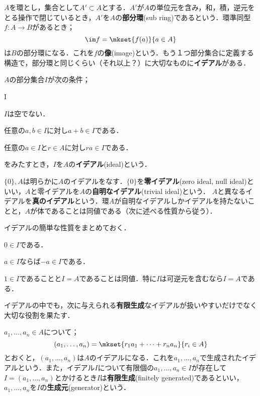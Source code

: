 $A$を環とし，集合として$A'\subset A$とする．$A'$が$A$の単位元を含み，和，積，逆元をとる操作で閉じているとき，$A'$を$A$の\textbf{部分環}(sub ring)であるという．環準同型$f:A\to B$があるとき；
\[\im f=\mkset{f(a)}{a\in A}\]
は$B$の部分環になる．これを$f$の\textbf{像}(image)という．もう１つ部分集合に定義する構造で，部分環と同じくらい（それ以上？）に大切なものに\textbf{イデアル}がある．

\begin{defi}[イデアル]
	$A$の部分集合$I$が次の条件；
	\begin{defiterm}{I}
		\item $I$は空でない．
		\item 任意の$a,b\in I$に対し$a+b\in I$である．
		\item 任意の$a\in I$と$r\in A$に対し$ra\in I$である．
	\end{defiterm}
	をみたすとき，$I$を$A$の\textbf{イデアル}(ideal)という．
\end{defi}

$\{0\},A$は明らかに$A$のイデアルをなす．$\{0\}$を\textbf{零イデアル}(zero ideal, null ideal)といい，$A$と零イデアルを$A$の\textbf{自明なイデアル}(trivial ideal)という． $A$と異なるイデアルを\textbf{真のイデアル}という．環$A$が自明なイデアルしかイデアルを持たないことと，$A$が体であることは同値である（次に述べる性質から従う）．

イデアルの簡単な性質をまとめておく．
\begin{sakura}
	\item $0\in I$である．
	\item $a\in I$ならば$-a\in I$である．
	\item $1\in I$であることと$I=A$であることは同値．特に$I$は可逆元を含むなら$I=A$である．
\end{sakura}

イデアルの中でも，次に与えられる\textbf{有限生成}なイデアルが扱いやすいだけでなく大切な役割を果たす．

\begin{defi}[有限生成イデアル]
	$a_1,\dots,a_n\in A$について；
	\[(a_1,\dots,a_n)=\mkset{r_1a_1+\dots+r_na_n}{r_i\in A}\]
	とおくと，$(a_1,\dots,a_n)$は$A$のイデアルになる．これを$a_1,\dots,a_n$で生成されたイデアルという．また，イデアル$I$について有限個の$a_1,\dots,a_n\in I$が存在して$I=(a_1,\dots,a_n)$とかけるとき$I$は\textbf{有限生成}(finitely generated)であるといい，$a_1,\dots,a_n$を$I$の\textbf{生成元}(generator)という．
\end{defi}

